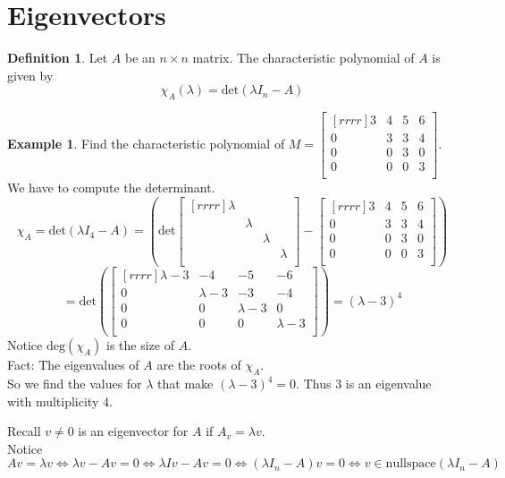 \documentclass{report}
\theoremstyle{plain}
\theoremstyle{definition}
\newtheorem*{ex}{Example}
\newtheorem*{defn}{Definition}
\theoremstyle{plain}
\begin{document}
\section{Eigenvectors}
\begin{defn}
Let $A$ be an $n \times n$ matrix. The characteristic polynomial of $A$ is given by
\[ \chi_A(\lambda)=\mathrm{det}(\lambda I_n-A) \]
\end{defn}
\begin{ex}
Find the characteristic polynomial of $M=\begin{bmatrix}[rrrr]3&4&5&6\\0&3&3&4\\0&0&3&0\\0&0&0&3\\\end{bmatrix}$.\\
We have to compute the determinant.
\[ \chi_A =\mathrm{det}(\lambda I_4-A)=\left (\mathrm{det}\begin{bmatrix}[rrrr]\lambda&{}&{}&{}\\{}&\lambda&{}&{}\\{}&{}&\lambda&{}\\{}&{}&{}&\lambda\\\end{bmatrix}-\begin{bmatrix}[rrrr]3&4&5&6\\0&3&3&4\\0&0&3&0\\0&0&0&3\\\end{bmatrix} \right )\]
\[ = \mathrm{det}\left (\begin{bmatrix}[rrrr]\lambda - 3& -4 & -5 & -6\\0 & \lambda - 3& -3 & -4\\0&0&\lambda - 3 & 0\\0&0&0&\lambda - 3\\\end{bmatrix}\right ) = (\lambda - 3)^4 \]
Notice $\mathrm{deg}(\chi_A)$ is the size of $A$.\\
Fact: The eigenvalues of $A$ are the roots of $\chi_A$.\\
So we find the values for $\lambda$ that make $(\lambda - 3)^4 = 0$. Thus $3$ is an eigenvalue with multiplicity $4$.
\end{ex}

Recall $v\neq 0$ is an eigenvector for $A$ if $A_v=\lambda v$.\\
Notice $Av=\lambda v \iff \lambda v - Av = 0 \iff \lambda Iv - Av = 0 \iff (\lambda I_n-A)v = 0 \iff v\in \mathrm{nullspace}(\lambda I_n-A)$
\end{document}
